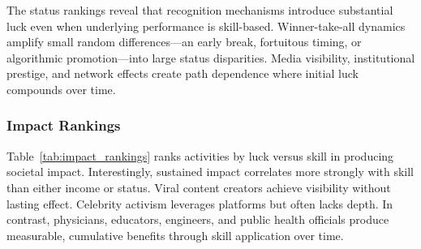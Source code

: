   The status rankings reveal that recognition mechanisms introduce substantial
  luck even when underlying performance is skill-based. Winner-take-all
  dynamics amplify small random differences—an early break, fortuitous
  timing, or algorithmic promotion—into large status disparities. Media
  visibility, institutional prestige, and network effects create path
  dependence where initial luck compounds over time.

  \subsubsection{Impact Rankings}

  Table~\ref{tab:impact_rankings} ranks activities by luck versus skill
  in producing societal impact. Interestingly, sustained impact correlates
  more strongly with skill than either income or status. Viral content
  creators achieve visibility without lasting effect. Celebrity activism
  leverages platforms but often lacks depth. In contrast, physicians,
  educators, engineers, and public health officials produce measurable,
  cumulative benefits through skill application over time.


